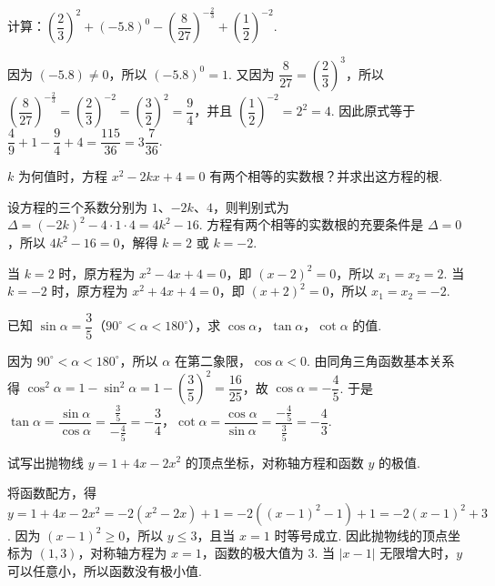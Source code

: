 \begin{problem}
计算：\(\left(\dfrac{2}{3}\right)^2+\left(-5.8\right)^0-\left(\dfrac{8}{27}\right)^{-\frac23}+\left(\dfrac12\right)^{-2}\).
\end{problem}

\begin{solution}
因为 \((-5.8)\neq0\)，所以 \((-5.8)^0=1\). 又因为 \(\dfrac{8}{27}=\left(\dfrac23\right)^3\)，所以 \(\left(\dfrac{8}{27}\right)^{-\frac23}=\left(\dfrac23\right)^{-2}=\left(\dfrac32\right)^2=\dfrac94\)，并且 \(\left(\dfrac12\right)^{-2}=2^2=4\). 因此原式等于 \(\dfrac49+1-\dfrac94+4=\dfrac{115}{36}=3\dfrac7{36}\).
\end{solution}

\begin{problem}
\(k\) 为何值时，方程 \(x^2-2kx+4=0\) 有两个相等的实数根？并求出这方程的根.
\end{problem}

\begin{solution}
设方程的三个系数分别为 \(1\)、\(-2k\)、\(4\)，则判别式为 \(\Delta=(-2k)^2-4\cdot1\cdot4=4k^2-16\). 方程有两个相等的实数根的充要条件是 \(\Delta=0\)，所以 \(4k^2-16=0\)，解得 \(k=2\) 或 \(k=-2\).

当 \(k=2\) 时，原方程为 \(x^2-4x+4=0\)，即 \((x-2)^2=0\)，所以 \(x_1=x_2=2\). 当 \(k=-2\) 时，原方程为 \(x^2+4x+4=0\)，即 \((x+2)^2=0\)，所以 \(x_1=x_2=-2\).
\end{solution}

\begin{problem}
已知 \(\sin\alpha=\dfrac35\)（\(90^\circ<\alpha<180^\circ\)），求 \(\cos\alpha\)，\(\tan\alpha\)，\(\cot\alpha\) 的值.
\end{problem}

\begin{solution}
因为 \(90^\circ<\alpha<180^\circ\)，所以 \(\alpha\) 在第二象限，\(\cos\alpha<0\). 由同角三角函数基本关系得 \(\cos^2\alpha=1-\sin^2\alpha=1-\left(\dfrac35\right)^2=\dfrac{16}{25}\)，故 \(\cos\alpha=-\dfrac45\). 于是 \(\tan\alpha=\dfrac{\sin\alpha}{\cos\alpha}=\dfrac{\frac{3}{5}}{-\frac{4}{5}}=-\dfrac34\)，\(\cot\alpha=\dfrac{\cos\alpha}{\sin\alpha}=\dfrac{-\frac{4}{5}}{\frac{3}{5}}=-\dfrac43\).
\end{solution}

\begin{problem}
试写出抛物线 \(y=1+4x-2x^2\) 的顶点坐标，对称轴方程和函数 \(y\) 的极值.
\end{problem}

\begin{solution}
将函数配方，得 \(y=1+4x-2x^2=-2(x^2-2x)+1=-2\left((x-1)^2-1\right)+1=-2(x-1)^2+3\). 因为 \((x-1)^2\geqslant0\)，所以 \(y\leqslant3\)，且当 \(x=1\) 时等号成立. 因此抛物线的顶点坐标为 \((1,3)\)，对称轴方程为 \(x=1\)，函数的极大值为 \(3\). 当 \(|x-1|\) 无限增大时，\(y\) 可以任意小，所以函数没有极小值.
\end{solution}

